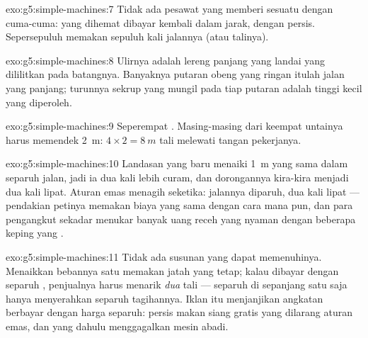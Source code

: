 \begin{solution}{exo:g5:simple-machines:7}
Tidak ada pesawat yang memberi sesuatu dengan cuma-cuma:  yang
dihemat dibayar kembali dalam jarak, dengan persis. Sepersepuluh 
memakan sepuluh kali jalannya (atau talinya).
\end{solution}

\begin{solution}{exo:g5:simple-machines:8}
Ulirnya adalah lereng panjang yang landai yang dililitkan pada
batangnya. Banyaknya putaran obeng yang ringan itulah jalan yang
panjang; turunnya sekrup yang mungil pada tiap putaran adalah tinggi
kecil yang diperoleh.
\end{solution}

\begin{solution}{exo:g5:simple-machines:9}
Seperempat . Masing-masing dari keempat untainya harus
memendek \qty{2}{m}: $4 \times 2 = \qty{8}{m}$ tali melewati tangan
pekerjanya.
\end{solution}

\begin{solution}{exo:g5:simple-machines:10}
Landasan yang baru menaiki \qty{1}{m} yang sama dalam separuh jalan,
jadi ia dua kali lebih curam, dan dorongannya kira-kira menjadi dua
kali lipat. Aturan emas menagih seketika: jalannya diparuh, 
dua kali lipat --- pendakian petinya memakan biaya yang sama dengan
cara mana pun, dan para pengangkut sekadar menukar banyak uang receh
yang nyaman dengan beberapa keping yang .
\end{solution}

\begin{solution}{exo:g5:simple-machines:11}
Tidak ada susunan yang dapat memenuhinya. Menaikkan bebannya satu
 memakan jatah  yang tetap; kalau dibayar dengan separuh
, penjualnya harus menarik \emph{dua}  tali --- separuh 
di sepanjang satu  saja hanya menyerahkan separuh tagihannya.
Iklan itu menjanjikan angkatan berbayar dengan harga separuh: persis
makan siang gratis yang dilarang aturan emas, dan yang dahulu
menggagalkan mesin abadi.
\end{solution}

